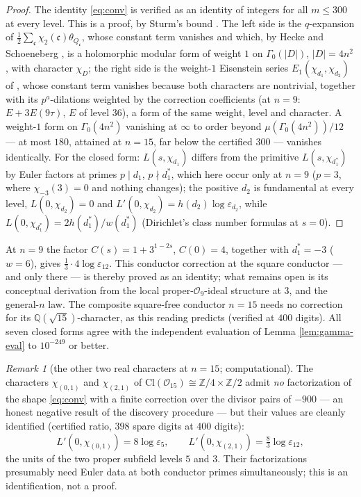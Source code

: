 \documentclass[11pt]{amsart}
\numberwithin{equation}{section}
\theoremstyle{plain}
\theoremstyle{definition}
\theoremstyle{remark}
\newtheorem{remark}[theorem]{Remark}
\newcommand{\Q}{\mathbb{Q}}
\newcommand{\Z}{\mathbb{Z}}
\newcommand{\Cl}{\mathrm{Cl}}
\newcommand{\idealc}{\mathfrak{c}}
\newcommand{\Oc}{\mathcal{O}}
\newcommand{\eps}{\varepsilon}
\begin{document}
\begin{proof}
The identity \eqref{eq:conv} is verified as an identity of integers for
all $m \le 300$ at every level.  This is a proof, by Sturm's bound
\cite{Sturm1987}.  The left side is the $q$-expansion of
$\tfrac12\sum_\idealc\chi_2(\idealc)\theta_{Q_\idealc}$, whose constant
term vanishes and which, by Hecke and Schoeneberg
\cite{Schoeneberg1939}, is a holomorphic modular form of weight $1$ on
$\Gamma_0(|D|)$, $|D| = 4n^2$, with character $\chi_D$; the right side
is the weight-$1$ Eisenstein series $E_1(\chi_{d_1}, \chi_{d_2})$ of
\cite[\S4.8]{DiamondShurman2005}, whose constant term vanishes because
both characters are nontrivial, together with its $p^a$-dilations
weighted by the correction coefficients (at $n = 9$: $E + 3E(9\tau)$,
$E$ of level $36$), a form of the same weight, level and character.  A
weight-$1$ form on $\Gamma_0(4n^2)$ vanishing at $\infty$ to order beyond
$\mu(\Gamma_0(4n^2))/12$ --- at most $180$, attained at $n = 15$, far below
the certified $300$ --- vanishes identically.  For the closed form:
$L(s,\chi_{d_1})$ differs from the primitive $L(s,\chi_{d_1^*})$ by Euler
factors at primes $p \mid d_1$, $p \nmid d_1^*$, which here occur only at
$n = 9$ ($p = 3$, where $\chi_{-3}(3) = 0$ and nothing changes); the
positive $d_2$ is fundamental at every level, $L(0,\chi_{d_2}) = 0$ and
$L'(0,\chi_{d_2}) = h(d_2)\log\eps_{d_2}$, while $L(0,\chi_{d_1^*}) =
2h(d_1^*)/w(d_1^*)$ (Dirichlet's class number formulas at $s = 0$).
\end{proof}

At $n = 9$ the factor $C(s) = 1 + 3^{1-2s}$, $C(0) = 4$, together with
$d_1^* = -3$ ($w = 6$), gives $\tfrac13\cdot 4\log\eps_{12}$.  This
conductor correction at the square conductor --- and only there --- is
thereby proved as an identity; what remains open is its conceptual
derivation from the local proper-$\Oc_9$-ideal structure at $3$, and the
general-$n$ law.  The composite square-free conductor $n = 15$ needs no
correction for its $\Q(\sqrt{15})$-character, as this reading predicts
(verified at $400$ digits).  All seven closed forms agree with the
independent evaluation of Lemma \ref{lem:gamma-eval} to $10^{-249}$ or
better.

\begin{remark}[the other two real characters at $n = 15$; computational]
\label{rem:n15}
The characters $\chi_{(0,1)}$ and $\chi_{(2,1)}$ of $\Cl(\Oc_{15}) \cong
\Z/4\times\Z/2$ admit \emph{no} factorization of the shape \eqref{eq:conv}
with a finite correction over the divisor pairs of $-900$ --- an honest
negative result of the discovery procedure --- but their values are
cleanly identified (certified ratio, $398$ spare digits at $400$ digits):
\[
  L'(0,\chi_{(0,1)}) = 8\log\eps_5, \qquad
  L'(0,\chi_{(2,1)}) = \tfrac83\log\eps_{12},
\]
the units of the two proper subfield levels $5$ and $3$.  Their
factorizations presumably need Euler data at both conductor primes
simultaneously; this is an identification, not a proof.
\end{remark}
\end{document}
